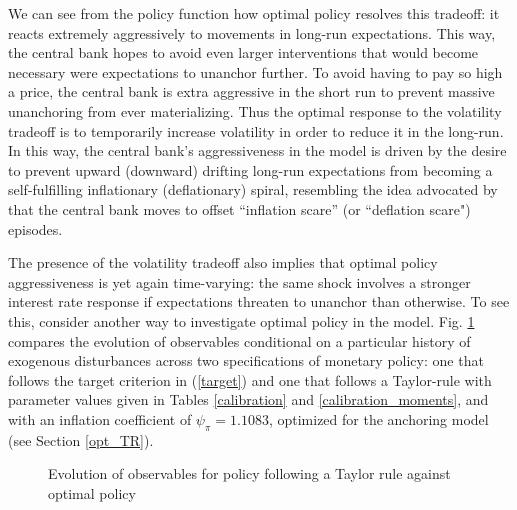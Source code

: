 \documentclass[11pt]{article}
\def \myFigPath {../../figures/}
\renewcommand{\[}{\begin{equation}}
\renewcommand{\]}{\end{equation}}
\def\fignamePEAobsTR{implement_anchTC_obs_TR_approx24_Sep_2020_09_32_19}
\def\fignamePEAobsAnch{implement_anchTC_obs_approx24_Sep_2020_09_35_43}
\begin{document}
We can see from the policy function how optimal policy resolves this tradeoff: it reacts extremely aggressively to movements in long-run expectations. This way, the central bank hopes to avoid even larger interventions that would become necessary were expectations to unanchor further. To avoid having to pay so high a price, the central bank is extra aggressive in the short run to prevent massive unanchoring from ever materializing. Thus the optimal response to the volatility tradeoff is to temporarily increase volatility in order to reduce it in the long-run. In this way, the central bank's aggressiveness in the model is driven by the desire to prevent upward (downward) drifting long-run expectations from becoming a self-fulfilling inflationary (deflationary) spiral, resembling the idea advocated by \cite{goodfriend1993interest} that the central bank moves to offset ``inflation scare'' (or ``deflation scare") episodes.

The presence of the volatility tradeoff also implies that optimal policy aggressiveness is yet again time-varying: the same shock involves a stronger interest rate response if expectations threaten to unanchor than otherwise. To see this, consider another way to investigate optimal policy in the model. Fig. \ref{pea_TCvsTR} compares the evolution of observables conditional on a particular history of exogenous disturbances across two specifications of monetary policy: one that follows the target criterion in (\ref{target}) and one that follows a Taylor-rule with parameter values given in Tables \ref{calibration} and \ref{calibration_moments}, and with an inflation coefficient of $\psi_{\pi} = 1.1083$, optimized for the anchoring model (see Section \ref{opt_TR}).

\begin{figure}[h!]
\hfill %
\caption{Evolution of observables for policy following a Taylor rule against optimal policy}
\label{pea_TCvsTR}
\end{figure}
\end{document}
